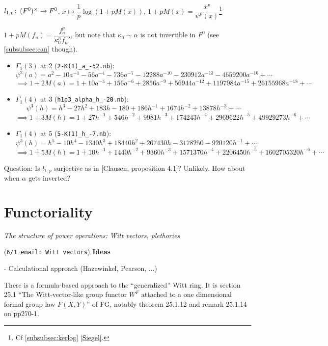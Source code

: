 \documentclass{rs}
\theoremstyle{definition}
\theoremstyle{remark}
\def\co{\colon\thinspace}
\newcommand{\A}{\alpha}
\newcommand{\G}{\Gamma}
\newcommand{\K}{\kappa}
\newcommand{\p}{\psi^3}
\renewcommand{\=}{\approx}
\renewcommand{\-}{\sim}
\numberwithin{equation}{section}
\numberwithin{thm}{section}
\begin{document}
$l_{1,p} \co (F^0)^\times \to F^0$, $x \mapsto \dfrac{1}{p} \log(1 + p M(x))$, $1 + p M(x) = \dfrac{x^p}{\psi^p(x)}$\footnote{Cf \ref{subsubsec:kerlog} \eqref{Siegel}.  } 

$1 + p M(f_n) = \dfrac{f_n^p}{\K_0^n f_n'}$, but note that $\K_0 \sim \A$ is not invertible in $F^0$ (see \ref{subsubsec:can} though).  

\begin{itemize}
 \item $\G_1(3)$ at 2 (\texttt{2-K(1)\_a\_-52.nb}): 
 \[
  \psi^2(a) = a^2 - 10 a^{-1} - 56 a^{-4} - 736 a^{-7} - 12288 a^{-10} - 230912 a^{-13} - 4659200 a^{-16} + \cdots 
 \]
 \[
  \implies 1 + 2 M(a) = 1 + 10 a^{-3} + 156 a^{-6} + 2856 a^{-9} + 56944 a^{-12} + 1197984 a^{-15} + 26155968 a^{-18} + \cdots 
 \]

 \item $\G_1(4)$ at 3 (\texttt{h1p3\_alpha\_h\_-20.nb}): 
 \[
  \p(h) = h^3 - 27 h^2 + 183 h - 180 + 186 h^{-1} + 1674 h^{-2} + 13878 h^{-3} + \cdots 
 \]
 \[
  \implies 1 + 3 M(h) = 1 + 27 h^{-1} + 546 h^{-2} + 9981 h^{-3} + 174243 h^{-4} + 2969622 h^{-5} + 49929273 h^{-6} + \cdots 
 \]

 \item $\G_1(4)$ at 5 (\texttt{5-K(1)\_h\_-7.nb}): 
 \[
  \p(h) = h^5 - 10 h^4 - 1340 h^3 + 18440 h^2 + 267430 h - 3178250 - 920120 h^{-1} + \cdots 
 \]
 \[
  \implies 1 + 5 M(h) = 1 + 10 h^{-1} + 1440 h^{-2} + 9360 h^{-3} + 1571370 h^{-4} + 2206450 h^{-5} + 1602705320 h^{-6} + \cdots 
 \]
\end{itemize}

Question: Is $l_{1,p}$ surjective as in [Clausen, proposition 4.1]?  Unlikely.  
How about when $\A$ gets inverted?  


\newpage
\section{Functoriality}

{\em The structure of power operations: Witt vectors, plethories}

(\texttt{6/1 email: Witt vectors}) \textbf{Ideas}

- Calculational approach (Hazewinkel, Pearson, ...)

There is a formula-based approach to the ``generalized'' Witt ring. 
It is section 25.1 ``The Witt-vector-like group functor $W^F$ attached to a one dimensional formal group law $F(X, Y)$'' of FG, notably theorem 25.1.12 and remark 25.1.14 on pp270-1.
\end{document}
